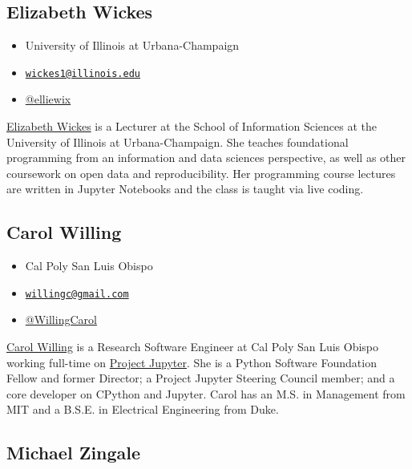 \documentclass[]{book}
\providecommand{\tightlist}{%
  \setlength{\itemsep}{0pt}\setlength{\parskip}{0pt}}
\begin{document}
\subsection{Elizabeth Wickes}\label{elizabeth-wickes}

\begin{itemize}
\tightlist
\item
  University of Illinois at Urbana-Champaign
\item
  \href{mailto:wickes1@illinois.edu}{\nolinkurl{wickes1@illinois.edu}}
\item
  \href{https://twitter.com/elliewix}{@elliewix}
\end{itemize}

\href{https://ischool.illinois.edu/people/elizabeth-wickes}{Elizabeth
Wickes} is a Lecturer at the School of Information Sciences at the
University of Illinois at Urbana-Champaign. She teaches foundational
programming from an information and data sciences perspective, as well
as other coursework on open data and reproducibility. Her programming
course lectures are written in Jupyter Notebooks and the class is taught
via live coding.

\subsection{Carol Willing}\label{carol-willing}

\begin{itemize}
\tightlist
\item
  Cal Poly San Luis Obispo
\item
  \href{mailto:willingc@gmail.com}{\nolinkurl{willingc@gmail.com}}
\item
  \href{https://twitter.com/WillingCarol}{@WillingCarol}
\end{itemize}

\href{https://www.willingconsulting.com/about/}{Carol Willing} is a
Research Software Engineer at Cal Poly San Luis Obispo working full-time
on \href{https://jupyter.org/}{Project Jupyter}. She is a Python
Software Foundation Fellow and former Director; a Project Jupyter
Steering Council member; and a core developer on CPython and Jupyter.
Carol has an M.S. in Management from MIT and a B.S.E. in Electrical
Engineering from Duke.

\subsection{Michael Zingale}\label{michael-zingale}
\end{document}
